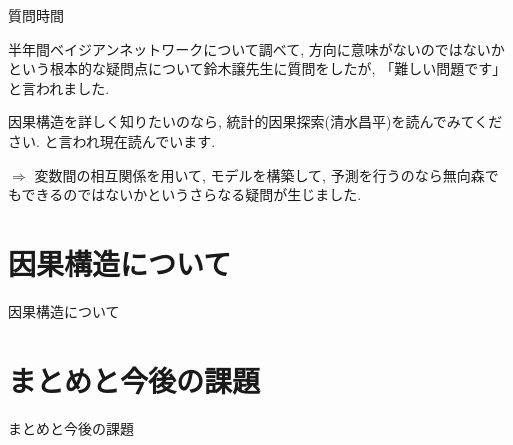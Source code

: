 \documentclass[dvipdfmx]{beamer}
\begin{document}
\begin{frame}{質問時間}

半年間ベイジアンネットワークについて調べて, 方向に意味がないのではないかという根本的な疑問点について鈴木譲先生に質問をしたが, 「難しい問題です」と言われました. 

\vspace{0.2cm}
因果構造を詳しく知りたいのなら, 統計的因果探索(清水昌平)を読んでみてください. と言われ現在読んでいます.

\vspace{0.2cm}
$\Rightarrow$ 変数間の相互関係を用いて, モデルを構築して, 予測を行うのなら無向森でもできるのではないかというさらなる疑問が生じました.

\end{frame}

\section{因果構造について}
\begin{frame}{因果構造について}

\end{frame}

\section{まとめと今後の課題}
\begin{frame}{まとめと今後の課題}

\end{frame}
\end{document}
